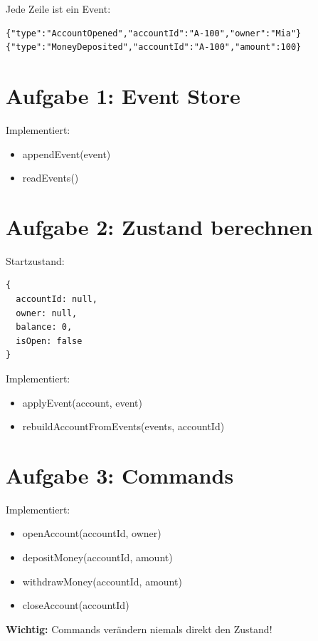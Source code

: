 \documentclass[a4paper,12pt]{article}
\begin{document}
Jede Zeile ist ein Event:

\begin{lstlisting}
{"type":"AccountOpened","accountId":"A-100","owner":"Mia"}
{"type":"MoneyDeposited","accountId":"A-100","amount":100}
\end{lstlisting}

\section*{Aufgabe 1: Event Store}

Implementiert:

\begin{itemize}
\item appendEvent(event)
\item readEvents()
\end{itemize}

\section*{Aufgabe 2: Zustand berechnen}

Startzustand:

\begin{lstlisting}
{
  accountId: null,
  owner: null,
  balance: 0,
  isOpen: false
}
\end{lstlisting}

Implementiert:

\begin{itemize}
\item applyEvent(account, event)
\item rebuildAccountFromEvents(events, accountId)
\end{itemize}

\section*{Aufgabe 3: Commands}

Implementiert:

\begin{itemize}
\item openAccount(accountId, owner)
\item depositMoney(accountId, amount)
\item withdrawMoney(accountId, amount)
\item closeAccount(accountId)
\end{itemize}

\textbf{Wichtig:}  
Commands verändern niemals direkt den Zustand!
\end{document}
